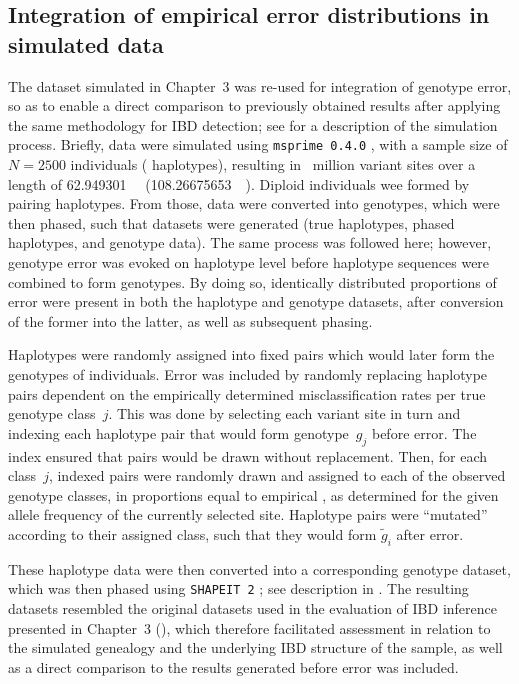 %
\subsection{Integration of empirical error distributions in simulated data}\label{sec:create_error_data}
%

The dataset simulated in Chapter~3 was re-used for integration of genotype error, so as to enable a direct comparison to previously obtained results after applying the same methodology for IBD detection; see  for a description of the simulation process.
Briefly, data were simulated using \texttt{msprime\,0.4.0} \citep{Kelleher:2016fn}, with a sample size of ${N=\num{2500}}$ individuals (\ie {} haplotypes), resulting in ~million variant sites over a length of \SI{62.949301}{\mega\basepair} (\SI{108.26675653}{\centi\morgan}).
Diploid individuals wee formed by pairing haplotypes.
From those, data were converted into genotypes, which were then phased, such that  datasets were generated (true haplotypes, phased haplotypes, and genotype data).
The same process was followed here; however, genotype error was evoked on haplotype level before haplotype sequences were combined to form genotypes.
By doing so, identically distributed proportions of error were present in both the haplotype and genotype datasets, after conversion of the former into the latter, as well as subsequent phasing.

Haplotypes were randomly assigned into fixed pairs which would later form the genotypes of individuals.
Error was included by randomly replacing haplotype pairs dependent on the empirically determined misclassification rates per true genotype class~$j$.
This was done by selecting each variant site in turn and indexing each haplotype pair that would form genotype~$g_j$ before error.
The index ensured that pairs would be drawn without replacement.
Then, for each class~$j$, indexed pairs were randomly drawn and assigned to each of the  observed genotype classes, in proportions equal to empirical , as determined for the given allele frequency of the currently selected site.
Haplotype pairs were ``mutated'' according to their assigned class, such that they would form $\tilde{g}_i$ after error.

These haplotype data were then converted into a corresponding genotype dataset, which was then phased using \texttt{SHAPEIT\,2} \citep{Delaneau:2008dk,Delaneau:2013hi}; see description in .
The  resulting datasets resembled the original datasets used in the evaluation of IBD inference presented in Chapter~3 (), which therefore facilitated assessment in relation to the simulated genealogy and the underlying IBD structure of the sample, as well as a direct comparison to the results generated before error was included.

